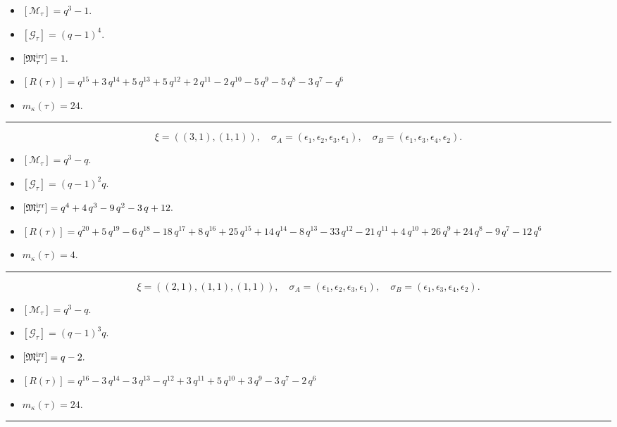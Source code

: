 \documentclass[10pt,a4paper]{amsart}
\begin{document}
\begin{itemize}
 \item $[\mathcal{M}_{\tau}] = q^{3} - 1 .$

 \item $[\mathcal{G}_{\tau}] = {\left(q - 1\right)}^{4} .$

 \item $[{\frak M}_{\tau}^{\textrm{irr}}] = 1 .$

 \item $[R(\tau)] = q^{15} + 3 \, q^{14} + 5 \, q^{13} + 5 \, q^{12} + 2 \, q^{11} - 2 \, q^{10} - 5 \, q^{9} - 5 \, q^{8} - 3 \, q^{7} - q^{6} $

 \item $m_{\kappa}(\tau) = 24 .$

 \end{itemize}
\noindent\rule{8cm}{0.4pt}

$$\xi = ({(3, 1)}, {(1, 1)}),\quad \sigma_A = ({{\epsilon_1, \epsilon_2, \epsilon_3}}, {{\epsilon_1}}),\quad \sigma_B = ({{\epsilon_1, \epsilon_3, \epsilon_4}}, {{\epsilon_2}}).$$

\begin{itemize}
 \item $[\mathcal{M}_{\tau}] = q^{3} - q .$

 \item $[\mathcal{G}_{\tau}] = {\left(q - 1\right)}^{2} q .$

 \item $[{\frak M}_{\tau}^{\textrm{irr}}] = q^{4} + 4 \, q^{3} - 9 \, q^{2} - 3 \, q + 12 .$

 \item $[R(\tau)] = q^{20} + 5 \, q^{19} - 6 \, q^{18} - 18 \, q^{17} + 8 \, q^{16} + 25 \, q^{15} + 14 \, q^{14} - 8 \, q^{13} - 33 \, q^{12} - 21 \, q^{11} + 4 \, q^{10} + 26 \, q^{9} + 24 \, q^{8} - 9 \, q^{7} - 12 \, q^{6} $

 \item $m_{\kappa}(\tau) = 4 .$

 \end{itemize}
\noindent\rule{8cm}{0.4pt}

$$\xi = ({(2, 1), (1, 1)}, {(1, 1)}),\quad \sigma_A = ({{\epsilon_1, \epsilon_2}, {\epsilon_3}}, {{\epsilon_1}}),\quad \sigma_B = ({{\epsilon_1, \epsilon_3}, {\epsilon_4}}, {{\epsilon_2}}).$$

\begin{itemize}
 \item $[\mathcal{M}_{\tau}] = q^{3} - q .$

 \item $[\mathcal{G}_{\tau}] = {\left(q - 1\right)}^{3} q .$

 \item $[{\frak M}_{\tau}^{\textrm{irr}}] = q - 2 .$

 \item $[R(\tau)] = q^{16} - 3 \, q^{14} - 3 \, q^{13} - q^{12} + 3 \, q^{11} + 5 \, q^{10} + 3 \, q^{9} - 3 \, q^{7} - 2 \, q^{6} $

 \item $m_{\kappa}(\tau) = 24 .$

 \end{itemize}
\noindent\rule{8cm}{0.4pt}
\end{document}

